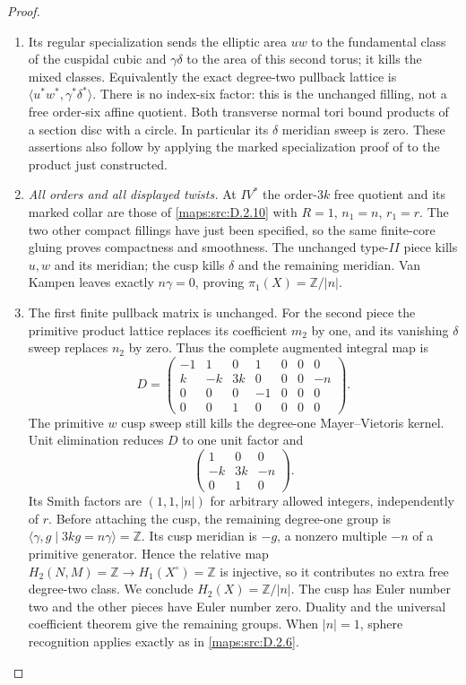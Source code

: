 \begin{proof}
\begin{enumerate}[label=\arabic*.,leftmargin=*]
\item Its regular specialization sends the elliptic area $uw$ to
the fundamental class of the cuspidal cubic and $\gamma\delta$
to the area of this second torus; it kills the mixed classes.
Equivalently the exact degree-two pullback lattice is
$\langle u^*w^*,\gamma^*\delta^*\rangle$.
There is no index-six factor: this is the unchanged filling,
not a free order-six affine quotient.
Both transverse normal tori bound products of a section disc
with a circle. In particular its $\delta$ meridian sweep is
zero. These assertions also follow by applying the marked
specialization proof of \cite[Proposition 3.11]{manLR26}
to the product just constructed.

\item \emph{All orders and all displayed twists.}
At $IV^*$ the order-$3k$ free quotient and its marked collar
are those of \ref{maps:src:D.2.10} with $R=1$, $n_1=n$, $r_1=r$.
The two other compact fillings have just been specified,
so the same finite-core gluing proves compactness and
smoothness. The unchanged type-$II$ piece kills $u,w$ and
its meridian; the cusp kills $\delta$ and the remaining
meridian. Van Kampen leaves exactly $n\gamma=0$, proving
$\pi_1(X)=\mathbb Z/|n|$.

\item The first finite pullback matrix is unchanged. For the second
piece the primitive product lattice replaces its coefficient
$m_2$ by one, and its vanishing $\delta$ sweep replaces $n_2$
by zero. Thus the complete augmented integral map is
\[
 D=\begin{pmatrix}
 -1&1&0&1&0&0&0\\
 k&-k&3k&0&0&0&-n\\
 0&0&0&-1&0&0&0\\
 0&0&1&0&0&0&0
 \end{pmatrix}.
\]
The primitive $w$ cusp sweep still kills the degree-one
Mayer--Vietoris kernel. Unit elimination reduces $D$ to
one unit factor and
\[
 \begin{pmatrix}1&0&0\\-k&3k&-n\\0&1&0\end{pmatrix}.
\]
Its Smith factors are $(1,1,|n|)$ for arbitrary allowed
integers, independently of $r$.
Before attaching the cusp, the remaining degree-one group is
$\langle\gamma,g\mid3kg=n\gamma\rangle=\mathbb Z$.
Its cusp meridian is $-g$, a nonzero multiple $-n$ of a
primitive generator. Hence the relative map
$H_2(N,M)=\mathbb Z\to H_1(X^\circ)=\mathbb Z$ is injective,
so it contributes no extra free degree-two class.
We conclude $H_2(X)=\mathbb Z/|n|$.
The cusp has Euler number two and the other pieces have
Euler number zero. Duality and the universal coefficient
theorem give the remaining groups. When $|n|=1$, sphere
recognition applies exactly as in \ref{maps:src:D.2.6}.


\end{enumerate}
\end{proof}
